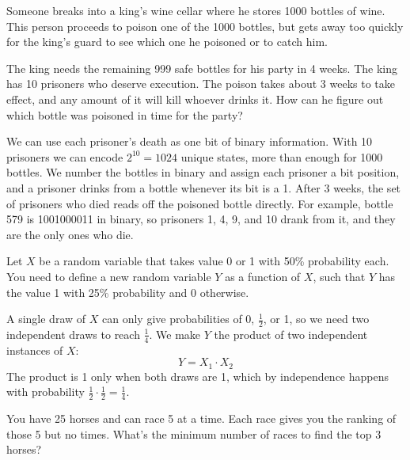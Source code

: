 \begin{problem}
Someone breaks into a king's wine cellar where he stores 1000 bottles of wine. This person proceeds to poison one of the 1000 bottles, but gets away too quickly for the king's guard to see which one he poisoned or to catch him.

The king needs the remaining 999 safe bottles for his party in 4 weeks. The king has 10 prisoners who deserve execution. The poison takes about 3 weeks to take effect, and any amount of it will kill whoever drinks it. How can he figure out which bottle was poisoned in time for the party?
\end{problem}

\begin{solution}
We can use each prisoner's death as one bit of binary information. With 10 prisoners we can encode $2^{10} = 1024$ unique states, more than enough for 1000 bottles. We number the bottles in binary and assign each prisoner a bit position, and a prisoner drinks from a bottle whenever its bit is a 1. After 3 weeks, the set of prisoners who died reads off the poisoned bottle directly. For example, bottle 579 is 1001000011 in binary, so prisoners 1, 4, 9, and 10 drank from it, and they are the only ones who die.
\end{solution}

\begin{problem}
Let $X$ be a random variable that takes value 0 or 1 with 50\% probability each. You need to define a new random variable $Y$ as a function of $X$, such that $Y$ has the value 1 with 25\% probability and 0 otherwise.
\end{problem}

\begin{solution}
A single draw of $X$ can only give probabilities of 0, $\frac{1}{2}$, or 1, so we need two independent draws to reach $\frac{1}{4}$. We make $Y$ the product of two independent instances of $X$:
\[
Y = X_1 \cdot X_2
\]
The product is 1 only when both draws are 1, which by independence happens with probability $\frac{1}{2} \cdot \frac{1}{2} = \frac{1}{4}$.
\end{solution}

\begin{problem}
You have 25 horses and can race 5 at a time. Each race gives you the ranking of those 5 but no times. What's the minimum number of races to find the top 3 horses?
\end{problem}

